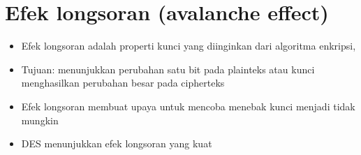 \documentclass{article}
\begin{document}

\section*{Efek longsoran (avalanche effect)}

\begin{itemize}
    \item Efek longsoran adalah properti kunci yang diinginkan dari algoritma enkripsi,
    \item Tujuan: menunjukkan perubahan satu bit pada plainteks atau kunci menghasilkan perubahan besar pada cipherteks
    \item Efek longsoran membuat upaya untuk mencoba menebak kunci menjadi tidak mungkin
    \item DES menunjukkan efek longsoran yang kuat
\end{itemize}
\end{document}
